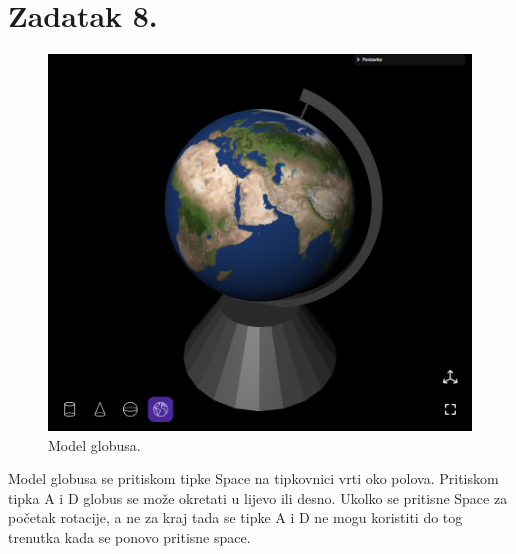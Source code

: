 \documentclass[a4paper,12pt]{article}
\begin{document}
\pagebreak
\section*{Zadatak 8.}
\begin{figure}[ht]
    \centering
    \includegraphics[scale=0.5]{image/zadatak8.png}
    \caption{Model globusa.}
\end{figure}
Model globusa se pritiskom tipke Space na tipkovnici vrti oko polova. Pritiskom tipka A i D globus se može okretati u lijevo ili desno. Ukolko se pritisne Space za početak rotacije, 
a ne za kraj tada se tipke A i D ne mogu koristiti do tog trenutka kada se ponovo pritisne space.

\pagebreak
\end{document}
